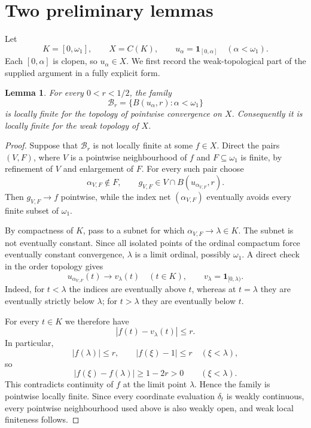 \documentclass[11pt]{article}
\newtheorem{lemma}[theorem]{Lemma}
\theoremstyle{remark}
\newcommand{\one}{\mathbf 1}
\begin{document}
\section{Two preliminary lemmas}

Let
\[
  K=[0,\omega_1],\qquad X=C(K),\qquad
  u_\alpha=\one_{[0,\alpha]}\quad(\alpha<\omega_1).
\]
Each $[0,\alpha]$ is clopen, so $u_\alpha\in X$.  We first record the
weak-topological part of the supplied argument in a fully explicit form.

\begin{lemma}\label{lem:localfinite}
For every $0<r<1/2$, the family
\[
  \mathcal B_r=\{B(u_\alpha,r):\alpha<\omega_1\}
\]
is locally finite for the topology of pointwise convergence on $X$.
Consequently it is locally finite for the weak topology of $X$.
\end{lemma}

\begin{proof}
Suppose that $\mathcal B_r$ is not locally finite at some $f\in X$.  Direct the
pairs $(V,F)$, where $V$ is a pointwise neighbourhood of $f$ and
$F\subseteq\omega_1$ is finite, by refinement of $V$ and enlargement of $F$.
For every such pair choose
\[
  \alpha_{V,F}\notin F,
  \qquad
  g_{V,F}\in V\cap B(u_{\alpha_{V,F}},r).
\]
Then $g_{V,F}\to f$ pointwise, while the index net
$(\alpha_{V,F})$ eventually avoids every finite subset of $\omega_1$.

By compactness of $K$, pass to a subnet for which
$\alpha_{V,F}\to\lambda\in K$.  The subnet is not eventually constant.  Since
all isolated points of the ordinal compactum force eventually constant
convergence, $\lambda$ is a limit ordinal, possibly $\omega_1$.  A direct check
in the order topology gives
\[
  u_{\alpha_{V,F}}(t)\longrightarrow v_\lambda(t)
  \quad(t\in K),
  \qquad
  v_\lambda=\one_{[0,\lambda)}.
\]
Indeed, for $t<\lambda$ the indices are eventually above $t$, whereas at
$t=\lambda$ they are eventually strictly below $\lambda$; for $t>\lambda$ they
are eventually below $t$.

For every $t\in K$ we therefore have
\[
  |f(t)-v_\lambda(t)|\le r.
\]
In particular,
\[
  |f(\lambda)|\le r,
  \qquad
  |f(\xi)-1|\le r\quad(\xi<\lambda),
\]
so
\[
  |f(\xi)-f(\lambda)|\ge 1-2r>0
  \qquad(\xi<\lambda).
\]
This contradicts continuity of $f$ at the limit point $\lambda$.  Hence the
family is pointwise locally finite.  Since every coordinate evaluation
$\delta_t$ is weakly continuous, every pointwise neighbourhood used above is
also weakly open, and weak local finiteness follows.
\end{proof}
\end{document}
